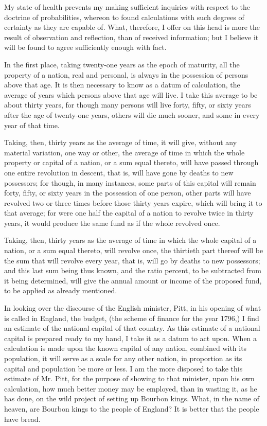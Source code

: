 My state of health prevents my making sufficient inquiries with respect to the doctrine of probabilities, whereon to found calculations with such degrees of certainty as they are capable of. What, therefore, I offer on this head is more the result of observation and reflection, than of received information; but I believe it will be found to agree sufficiently enough with fact.

In the first place, taking twenty-one years as the epoch of maturity, all the property of a nation, real and personal, is always in the possession of persons above that age. It is then necessary to know as a datum of calculation, the average of years which persons above that age will live. I take this average to be about thirty years, for though many persons will live forty, fifty, or sixty years after the age of twenty-one years, others will die much sooner, and some in every year of that time.

Taking, then, thirty years as the average of time, it will give, without any material variation, one way or other, the average of time in which the whole property or capital of a nation, or a sum equal thereto, will have passed through one entire revolution in descent, that is, will have gone by deaths to new possessors; for though, in many instances, some parts of this capital will remain forty, fifty, or sixty years in the possession of one person, other parts will have revolved two or three times before those thirty years expire, which will bring it to that average; for were one half the capital of a nation to revolve twice in thirty years, it would produce the same fund as if the whole revolved once.

Taking, then, thirty years as the average of time in which the whole capital of a nation, or a sum equal thereto, will revolve once, the thirtieth part thereof will be the sum that will revolve every year, that is, will go by deaths to new possessors; and this last sum being thus known, and the ratio percent, to be subtracted from it being determined, will give the annual amount or income of the proposed fund, to be applied as already mentioned.

In looking over the discourse of the English minister, Pitt, in his opening of what is called in England, the budget, (the scheme of finance for the year 1796,) I find an estimate of the national capital of that country. As this estimate of a national capital is prepared ready to my hand, I take it as a datum to act upon. When a calculation is made upon the known capital of any nation, combined with its population, it will serve as a scale for any other nation, in proportion as its capital and population be more or less. I am the more disposed to take this estimate of Mr. Pitt, for the purpose of showing to that minister, upon his own calculation, how much better money may be employed, than in wasting it, as he has done, on the wild project of setting up Bourbon kings. What, in the name of heaven, are Bourbon kings to the people of England? It is better that the people have bread.

